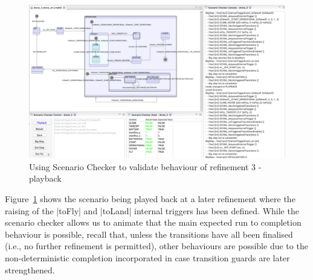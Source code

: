 \begin{figure}[!th]
\centering
\includegraphics[width=1.0\textwidth, trim=30 50 60 0]{figures/scenarioChecker_playback_drone3.png}
\caption{Using Scenario Checker to validate behaviour of refinement 3 - playback}
\label{fig:scenarioCheckerPlaybackDrone3}
\end{figure}

Figure~\ref{fig:scenarioCheckerPlaybackDrone3} shows the scenario being played back at a later refinement where the raising of the |toFly| and |toLand| internal triggers has been defined. 
While the scenario checker allows us to animate that the main expected run to completion behaviour is possible, recall that, unless the transitions have all been finalised (i.e., no further refinement is permitted),  other behaviours are possible due to the non-deterministic completion incorporated in case transition guards are later strengthened. 
 

